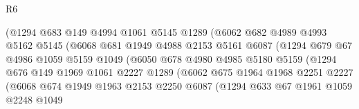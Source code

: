 \begin{lexlean}{R6}
\begin{coremodule}
                            (@1294
                              @683
                              @149
                              @4994
                              @1061
                              @5145
                              @1289
                              (@6062
                                @682
                                @4989
                                @4993
                                @5162
                                @5145
                                (@6068
                                  @681
                                  @1949
                                  @4988
                                  @2153
                                  @5161
                                  @6087
                                  (@1294
                                    @679
                                    @67
                                    @4986
                                    @1059
                                    @5159
                                    @1049
                                    (@6050
                                      @678
                                      @4980
                                      @4985
                                      @5180
                                      @5159
                                      (@1294
                                        @676
                                        @149
                                        @1969
                                        @1061
                                        @2227
                                        @1289
                                        (@6062
                                          @675
                                          @1964
                                          @1968
                                          @2251
                                          @2227
                                          (@6068
                                            @674
                                            @1949
                                            @1963
                                            @2153
                                            @2250
                                            @6087
                                            (@1294
                                              @633
                                              @67
                                              @1961
                                              @1059
                                              @2248
                                              @1049

\end{coremodule}
\end{lexlean}
